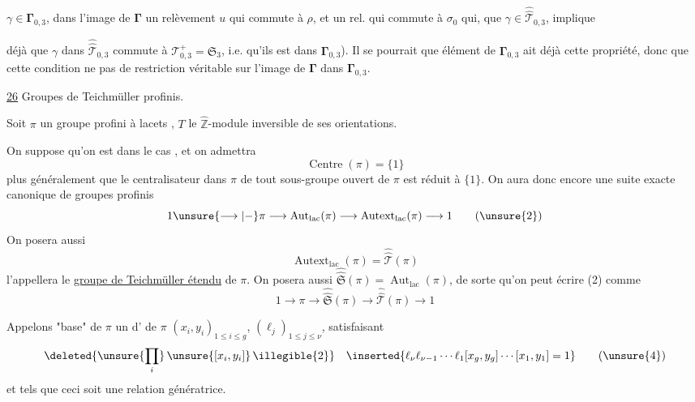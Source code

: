  $\gamma\in\boldsymbol{\Gamma}_{0,3}$,  dans l'image de $\boldsymbol{\Gamma}$    un relèvement $u$ qui commute à $\rho$, et un rel. qui commute à $\sigma_{0}$  qui,  que $\gamma\in\widehat{\widehat{\mathcal{T}}}_{0,3}$, implique


déjà que $\gamma$ dans $\widehat{\widehat{\mathcal{T}}}_{0,3}$ commute à $\mathcal{T}^{+}_{0,3}=\mathfrak{S}_{3}$,  i.e. qu'ils est dans $\boldsymbol{\Gamma}_{0,3}$). Il se pourrait que  élément de $\boldsymbol{\Gamma}_{0,3}$ ait déjà cette propriété, donc que cette condition ne  pas de restriction véritable sur l'image de $\boldsymbol{\Gamma}$ dans $\boldsymbol{\Gamma}_{0,3}$.


\uline{26} Groupes de Teichmüller profinis.


Soit $\pi$ un groupe profini à lacets , $T$ le $\widehat{\mathbb Z}$-module inversible de ses orientations.

On suppose qu'on est dans le cas , et on admettra 
\[
\operatorname{Centre}(\pi)=\{1\}
\tag{1}
\]
plus généralement que le centralisateur dans $\pi$ de tout sous-groupe ouvert de $\pi$ est réduit à $\{1\}$. On aura donc encore une suite exacte canonique de groupes profinis
\[
1 \unsure{\longrightarrow|{-}} \pi \longrightarrow \operatorname{Aut}_{\mathrm{lac}}(\pi) \longrightarrow \operatorname{Autext}_{\mathrm{lac}}(\pi) \longrightarrow 1
\tag{\unsure{2}}
\]
On posera aussi 
\[
\operatorname{Autext}_{\mathrm{lac}}(\pi)=\widehat{\widehat{\mathcal T}}(\pi)
\tag{3}
\]
 l'appellera le \uline{groupe de Teichmüller étendu} de $\pi$. On posera aussi $\widehat{\widehat{\mathfrak S}}(\pi)=\operatorname{Aut}_{\mathrm{lac}}(\pi)$, de sorte qu'on peut écrire (2) comme
\[
1 \longrightarrow \pi \longrightarrow \widehat{\widehat{\mathfrak S}}(\pi) \longrightarrow \widehat{\widehat{\mathcal T}}(\pi) \longrightarrow 1
\tag{2'}
\]

Appelons "base" de $\pi$ un  d' de $\pi$ $(x_i,y_i)_{1\leq i\leq g}$, $(\ell_j)_{1\leq j\leq\nu}$,  satisfaisant
\[
\deleted{\unsure{\prod_i}\,\unsure{[x_i,y_i]}\,\illegible{2}}
\quad
\inserted{\ell_\nu\ell_{\nu-1}\cdots\ell_1[x_g,y_g]\cdots[x_1,y_1]=1}
\tag{\unsure{4}}
\]
et tels que ceci soit une relation génératrice.

